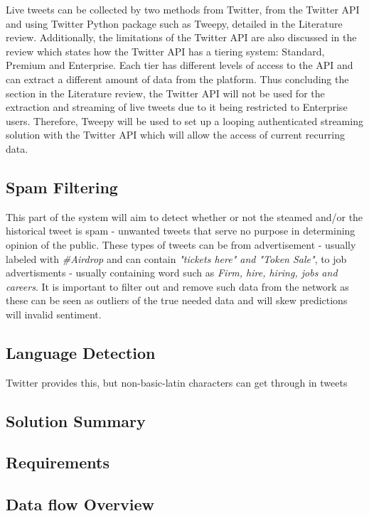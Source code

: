 \documentclass[oneside, 10pt]{article}
\begin{document}
		Live tweets can be collected by two methods from Twitter, from the Twitter API and using Twitter Python package such as Tweepy, detailed in the Literature review. Additionally, the limitations of the Twitter API are also discussed in the review which states how the Twitter API has a tiering system: Standard, Premium and Enterprise. Each tier has different levels of access to the API and can extract a different amount of data from the platform. Thus concluding the section in the Literature review, the Twitter API will not be used for the extraction and streaming of live tweets due to it being restricted to Enterprise users. Therefore, Tweepy will be used to set up a looping authenticated streaming solution with the Twitter API which will allow the access of current recurring data.
		
		\subsection{Spam Filtering}
		This part of the system will aim to detect whether or not the steamed and/or the historical tweet is spam - unwanted tweets that serve no purpose in determining opinion of the public. These types of tweets can be from advertisement - usually labeled with \textit{\#Airdrop} and can contain \textit{"tickets here" and "Token Sale"}, to job advertisments - usually containing word such as \textit{Firm, hire, hiring, jobs and careers}. It is important to filter out and remove such data from the network as these can be seen as outliers of the true needed data and will skew predictions will invalid sentiment.
		
		
		
		
		\subsection{Language Detection}
		Twitter provides this, but non-basic-latin characters can get through in tweets
		
		
		\subsection{Solution Summary}\label{sumary}
		
		\subsection{Requirements}
		
		
		
		\subsection{Data flow Overview}\label{data-flow}
		
\end{document}
